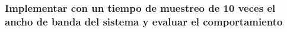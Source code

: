 \subsubsection{Implementar con un tiempo de muestreo de 10 veces el ancho de banda del sistema y evaluar el comportamiento}